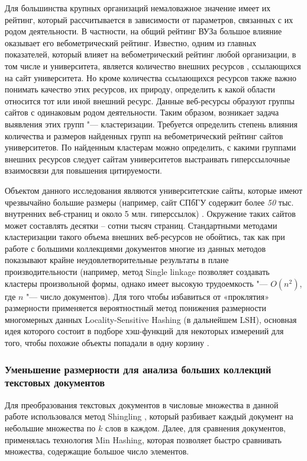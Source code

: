 Для большинства крупных организаций немаловажное значение имеет их рейтинг, который рассчитывается в зависимости от параметров, связанных с их родом деятельности. В частности, на общий рейтинг ВУЗа большое влияние оказывает его вебометрический рейтинг. Известно, одним из главных показателей, который влияет на вебометрический рейтинг любой организации, в том числе и университета, является количество внешних ресурсов \cite{RankingWeb}, ссылающихся на сайт университета. Но кроме количества ссылающихся ресурсов также важно понимать качество этих ресурсов, их природу, определить к какой области относится тот или иной внешний ресурс. Данные веб-ресурсы образуют группы сайтов с одинаковым родом деятельности. Таким образом, возникает задача выявления этих групп "--- кластеризации. Требуется определить степень влияния количества и размеров найденных групп на вебометрический рейтинг сайтов университетов. По найденным кластерам можно определить, с какими группами внешних ресурсов следует сайтам университетов выстраивать гиперссылочные взаимосвязи для повышения цитируемости.

Объектом данного исследования являются университетские сайты, которые имеют чрезвычайно большие размеры (например, сайт СПбГУ содержит более \textit{50} тыс. внутренних веб-страниц и около 5 млн. гиперссылок) \cite{BlekanovMoskalets,BlekanovSergeevMaksimovBOWTIE}. Окружение таких сайтов может составлять десятки – сотни тысяч страниц. Стандартными методами кластеризации такого объема внешних веб-ресурсов не обойтись, так как при работе с большими коллекциями документов многие из данных методов показывают крайне неудовлетворительные результаты в плане производительности \cite{EneImMoseley} (например, метод Single linkage позволяет создавать кластеры произвольной формы, однако имеет высокую трудоемкость "--- \(O(n^2)\), где \(n\) "--- число документов). Для того чтобы избавиться от «проклятия» размерности применяется вероятностный метод понижения размерности многомерных данных Locality-Sensitive Hashing (в дальнейшем LSH), основная идея которого состоит в подборе хэш-функций для некоторых измерений для того, чтобы похожие объекты попадали в одну корзину \cite{Buhler}.

\subsubsection{Уменьшение размерности для анализа больших коллекций текстовых документов}

Для преобразования текстовых документов в числовые множества в данной работе использовался метод Shingling \cite{Broder}, который разбивает каждый документ на небольшие множества по \(k\) слов в каждом. Далее, для сравнения документов, применялась технология Min Hashing, которая позволяет быстро сравнивать множества, содержащие большое число элементов.

